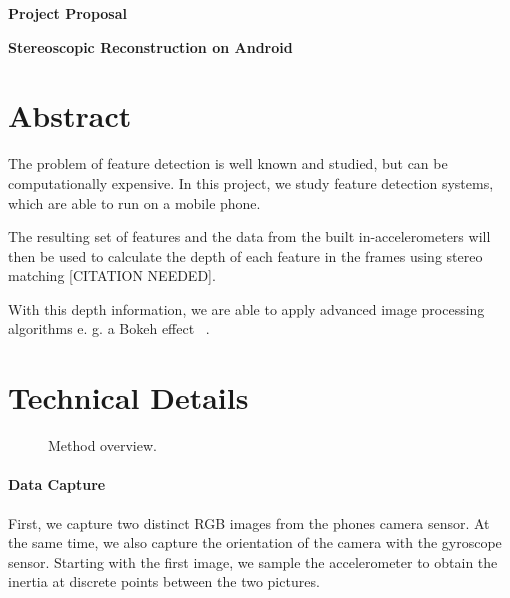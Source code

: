 \documentclass[a4paper,pagesize 10pt]{scrartcl}
\begin{document}
\begin{center}{\Huge\textbf{Project Proposal}}\end{center}
\begin{center}{\Large\textbf{Stereoscopic Reconstruction on Android}}\end{center}

\section{Abstract}

%
%
%
%
%
The problem of feature detection is well known and studied, but can be computationally expensive. In this project, we study feature detection systems, which are able to run on a mobile phone. 

The resulting set of features and the data from the built in-accelerometers will then be used to calculate the depth of each feature in the frames using stereo matching [CITATION NEEDED].

With this depth information, we are able to apply advanced image processing algorithms e. g. a Bokeh effect ~\cite{Lee2008}.
\section{Technical Details}

\begin{figure}[h]
	\centering
	\caption{Method overview.}
	\label{fig:overview}
\end{figure}

\paragraph{Data Capture}
First, we capture two distinct RGB images from the phones camera sensor. At the same time, we also capture the orientation of the camera with the gyroscope sensor. Starting with the first image, we sample the accelerometer to obtain the inertia at discrete points between the two pictures.
\end{document}
